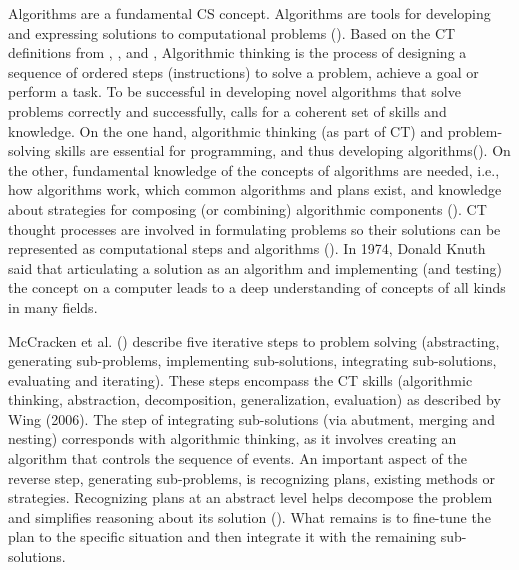 Algorithms are a fundamental CS concept. Algorithms are tools for developing and expressing solutions to computational problems (\cite{GroverPea2013}). Based on the CT definitions from \cite{CAS2014CT}, \cite{Google2017CT},\cite{BrennanResnick2012} and \cite{CSTA2011CT}, Algorithmic thinking is the process of designing a sequence of ordered steps (instructions) to solve a problem, achieve a goal or perform a task\cite{corradini2017conceptions}. To be successful in developing novel algorithms that solve problems correctly and successfully, calls for a coherent set of skills and knowledge. On the one hand, algorithmic thinking (as part of CT) and problem-solving skills are essential for programming, and thus developing algorithms(\cite{McCracken2001}). On the other, fundamental knowledge of the concepts of algorithms are needed, i.e., how algorithms work, which common algorithms and plans exist, and knowledge about strategies for composing (or combining) algorithmic components (\cite{deRaadt2008}). CT thought processes are involved in formulating problems so their solutions can be represented as computational steps and algorithms (\cite{aho2012computation}). In 1974, Donald Knuth said that articulating a solution as an algorithm and implementing (and testing) the concept on a computer leads to a deep understanding of concepts of all kinds in many fields.






McCracken et al. (\cite{McCracken2001}) describe five iterative steps to problem solving (abstracting, generating sub-problems, implementing sub-solutions, integrating sub-solutions, evaluating and iterating). These steps encompass the CT skills (algorithmic thinking, abstraction, decomposition, generalization, evaluation) as described by Wing (2006). The step of integrating sub-solutions (via abutment, merging and nesting) corresponds with algorithmic thinking, as it involves creating an algorithm that controls the sequence of events. An important aspect of the reverse step, generating sub-problems, is recognizing plans, existing methods or strategies. Recognizing plans at an abstract level helps decompose the problem and simplifies reasoning about its solution (\cite{Smetsers2017}). What remains is to fine-tune the plan to the specific situation and then integrate it with the remaining sub-solutions.


